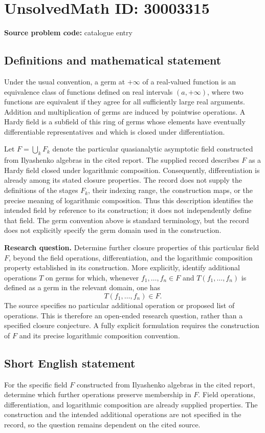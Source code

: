 \documentclass[11pt]{article}
\begin{document}
\section*{UnsolvedMath ID: 30003315}
\textbf{Source problem code:} catalogue entry
\subsection{Definitions and mathematical statement}
Under the usual convention, a germ at \(+\infty\) of a real-valued function is an equivalence class of functions defined on real intervals \((a,+\infty)\), where two functions are equivalent if they agree for all sufficiently large real arguments. Addition and multiplication of germs are induced by pointwise operations. A Hardy field is a subfield of this ring of germs whose elements have eventually differentiable representatives and which is closed under differentiation.

Let \(F=\bigcup_k F_k\) denote the particular quasianalytic asymptotic field constructed from Ilyashenko algebras in the cited report. The supplied record describes \(F\) as a Hardy field closed under logarithmic composition. Consequently, differentiation is already among its stated closure properties. The record does not supply the definitions of the stages \(F_k\), their indexing range, the construction maps, or the precise meaning of logarithmic composition. Thus this description identifies the intended field by reference to its construction; it does not independently define that field. The germ convention above is standard terminology, but the record does not explicitly specify the germ domain used in the construction.

\textbf{Research question.} Determine further closure properties of this particular field \(F\), beyond the field operations, differentiation, and the logarithmic composition property established in its construction. More explicitly, identify additional operations \(T\) on germs for which, whenever \(f_1,\ldots,f_n\in F\) and \(T(f_1,\ldots,f_n)\) is defined as a germ in the relevant domain, one has
\[
T(f_1,\ldots,f_n)\in F.
\]
The source specifies no particular additional operation or proposed list of operations. This is therefore an open-ended research question, rather than a specified closure conjecture. A fully explicit formulation requires the construction of \(F\) and its precise logarithmic composition convention.
\subsection{Short English statement}
For the specific field \(F\) constructed from Ilyashenko algebras in the cited report, determine which further operations preserve membership in \(F\). Field operations, differentiation, and logarithmic composition are already supplied properties. The construction and the intended additional operations are not specified in the record, so the question remains dependent on the cited source.
\end{document}
